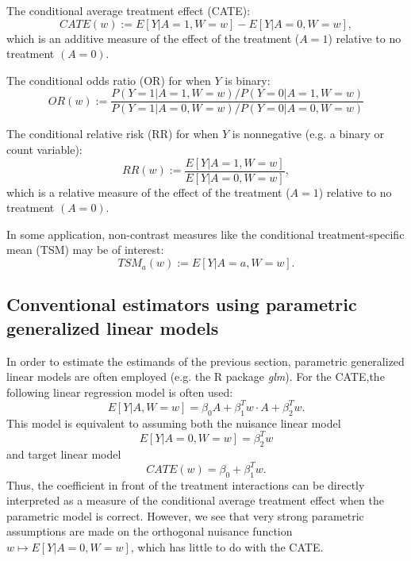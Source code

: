 \documentclass[article]{jss}
\begin{document}
\noindent The conditional average treatment effect (CATE):
\begin{equation}
CATE(w) := E[Y|A=1,W=w] - E[Y|A=0, W=w],
\end{equation}
which is an additive measure of the effect of the treatment ($A=1$) relative to no treatment $(A=0)$.

\vspace{0.5cm}


\noindent The conditional odds ratio (OR) for when $Y$ is binary:
\begin{equation}
OR(w) := \frac{P(Y=1|A=1,W=w)/P(Y=0|A=1,W=w)}{P(Y=1|A=0,W=w)/P(Y=0|A=0,W=w)}
\end{equation}

\vspace{0.5cm}

\noindent The conditional relative risk (RR) for when $Y$ is nonnegative (e.g. a binary or count variable):
\begin{equation}
RR(w) := \frac{E[Y|A=1,W=w]}{E[Y|A=0,W=w]},
\end{equation}
which is a relative measure of the effect of the treatment ($A=1$) relative to no treatment $(A=0)$.

\vspace{0.5cm}

\noindent In some application, non-contrast measures like the conditional treatment-specific mean (TSM) may be of interest:
\begin{equation}
TSM_a(w) := E[Y|A=a,W=w].
\end{equation}

\subsection{Conventional estimators using parametric generalized linear models}
In order to estimate the estimands of the previous section, parametric generalized linear models are often employed (e.g. the R package \textit{glm}). For the CATE,the following linear regression model is often used:
$$E[Y|A, W=w] = \beta_0 A +  \beta_1^T w \cdot A + \beta_2^T w.$$
This model is equivalent to assuming both the nuisance linear model
$$E[Y|A=0,W=w] =  \beta_2^T w$$
and target linear model
$$CATE(w) = \beta_0 + \beta_1^T w.$$
Thus, the coefficient in front of the treatment interactions can be directly interpreted as a measure of the conditional average treatment effect when the parametric model is correct. However, we see that very strong parametric assumptions are made on the orthogonal nuisance function $w \mapsto E[Y|A=0,W=w]$, which has little to do with the CATE.
\end{document}
